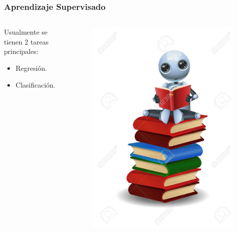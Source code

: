 \documentclass[10pt]{beamer}
\begin{document}
\begin{frame}
    \frametitle{Aprendizaje Supervisado}
    \begin{columns}
        \begin{column}{0.5\textwidth}
            Usualmente se tienen 2 tareas principales:
          \begin{itemize}
              \item Regresión.
              \item Clasificación.
          \end{itemize}
        \end{column}
        \begin{column}{0.5\textwidth}
          \begin{figure}[!h] 
            \centering
            \includegraphics[width=1\textwidth]{img/robot2}
          \end{figure}  
        \end{column}
      \end{columns}

\end{frame}
\end{document}
